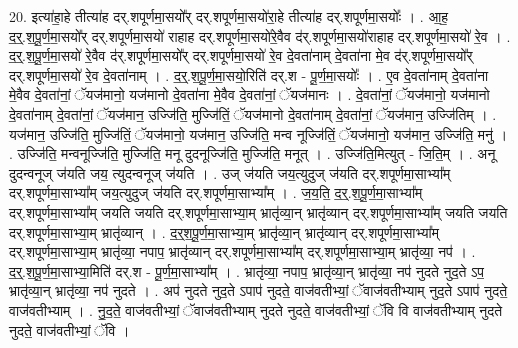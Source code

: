 \documentclass[17pt]{extarticle}
\begin{document}
20. इत्या॑हा॒हे तीत्या॑ह दर्.शपूर्णमा॒सयो᳚र् दर्.शपूर्णमा॒सयो॑रा॒हे तीत्या॑ह दर्.शपूर्णमा॒सयोः᳚ । . आ॒ह॒ द॒र्॒.श॒पू॒र्ण॒मा॒सयो᳚र् दर्.शपूर्णमा॒सयो॑ राहाह दर्.शपूर्णमा॒सयो॑रे॒वैव द॑र्.शपूर्णमा॒सयो॑राहाह दर्.शपूर्णमा॒सयो॑ रे॒व । . द॒र्॒.श॒पू॒र्ण॒मा॒सयो॑ रे॒वैव द॑र्.शपूर्णमा॒सयो᳚र् दर्.शपूर्णमा॒सयो॑ रे॒व दे॒वता॑नाम् दे॒वता॑ना मे॒व द॑र्.शपूर्णमा॒सयो᳚र् दर्.शपूर्णमा॒सयो॑ रे॒व दे॒वता॑नाम् । . द॒र्॒.श॒पू॒र्ण॒मा॒सयो॒रिति॑ दर्.श - पू॒र्ण॒मा॒सयोः᳚ । . ए॒व दे॒वता॑नाम् दे॒वता॑ना मे॒वैव दे॒वता॑नां॒ ॅयज॑मानो॒ यज॑मानो दे॒वता॑ना मे॒वैव दे॒वता॑नां॒ ॅयज॑मानः । . दे॒वता॑नां॒ ॅयज॑मानो॒ यज॑मानो दे॒वता॑नाम् दे॒वता॑नां॒ ॅयज॑मान॒ उज्जि॑ति॒ मुज्जि॑तिं॒ ॅयज॑मानो दे॒वता॑नाम् दे॒वता॑नां॒ ॅयज॑मान॒ उज्जि॑तिम् । . यज॑मान॒ उज्जि॑ति॒ मुज्जि॑तिं॒ ॅयज॑मानो॒ यज॑मान॒ उज्जि॑ति॒ मन्व नूज्जि॑तिं॒ ॅयज॑मानो॒ यज॑मान॒ उज्जि॑ति॒ मनु॑ । . उज्जि॑ति॒ मन्वनूज्जि॑ति॒ मुज्जि॑ति॒ मनू दुदनूज्जि॑ति॒ मुज्जि॑ति॒ मनूत् । . उज्जि॑ति॒मित्युत् - जि॒ति॒म् । . अनू दुदन्वनूज् ज॑यति जय॒ त्युदन्वनूज् ज॑यति । . उज् ज॑यति जय॒त्युदुज् ज॑यति दर्.शपूर्णमा॒साभ्या᳚म् दर्.शपूर्णमा॒साभ्या᳚म् जय॒त्युदुज् ज॑यति दर्.शपूर्णमा॒साभ्या᳚म् । . ज॒य॒ति॒ द॒र्॒.श॒पू॒र्ण॒मा॒साभ्या᳚म् दर्.शपूर्णमा॒साभ्या᳚म् जयति जयति दर्.शपूर्णमा॒साभ्या॒म् भ्रातृ॑व्या॒न् 
भ्रातृ॑व्यान् दर्.शपूर्णमा॒साभ्या᳚म् जयति जयति दर्.शपूर्णमा॒साभ्या॒म् भ्रातृ॑व्यान् । . द॒र्॒श॒पू॒र्ण॒मा॒साभ्या॒म् भ्रातृ॑व्या॒न् भ्रातृ॑व्यान् दर्.शपूर्णमा॒साभ्या᳚म् दर्.शपूर्णमा॒साभ्या॒म् भ्रातृ॑व्या॒ नपाप॒ भ्रातृ॑व्यान् दर्.शपूर्णमा॒साभ्या᳚म् दर्.शपूर्णमा॒साभ्या॒म् भ्रातृ॑व्या॒ नप॑ । . द॒र्॒.श॒पू॒र्ण॒मा॒साभ्या॒मिति॑ दर्.श - पू॒र्ण॒मा॒साभ्या᳚म् । . भ्रातृ॑व्या॒ नपाप॒ भ्रातृ॑व्या॒न् भ्रातृ॑व्या॒ नप॑ नुदते नुद॒ते ऽप॒ भ्रातृ॑व्या॒न् भ्रातृ॑व्या॒ नप॑ नुदते । . अप॑ नुदते नुद॒ते ऽपाप॑ नुदते॒ वाज॑वतीभ्यां॒ ॅवाज॑वतीभ्याम् नुद॒ते ऽपाप॑ नुदते॒ वाज॑वतीभ्याम् । . नु॒द॒ते॒ वाज॑वतीभ्यां॒ ॅवाज॑वतीभ्याम् नुदते नुदते॒ वाज॑वतीभ्यां॒ ॅवि वि वाज॑वतीभ्याम् नुदते नुदते॒ वाज॑वतीभ्यां॒ ॅवि । \newline
\end{document}
